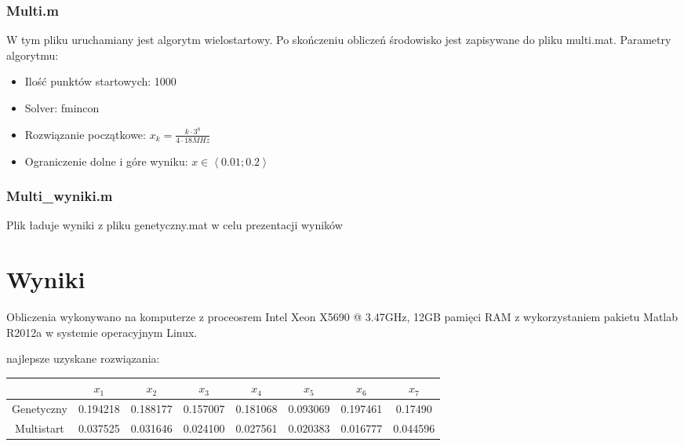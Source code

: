 \documentclass[10pt,a4paper]{article}
\begin{document}
\subsubsection{Multi.m}
W tym pliku uruchamiany jest algorytm wielostartowy.
Po skończeniu obliczeń środowisko jest zapisywane do pliku multi.mat.
Parametry algorytmu:
\begin{itemize}
\item Ilość punktów startowych: 1000
\item Solver: fmincon
\item Rozwiązanie początkowe: $x_k = \frac{k\cdot 3^8}{4 \cdot 18MHz}$
\item Ograniczenie dolne i góre wyniku: $x \in \left\langle 0.01;0.2 \right\rangle$
\end{itemize}
\subsubsection{Multi\_wyniki.m}
Plik ładuje wyniki z pliku genetyczny.mat w celu prezentacji wyników

\section{Wyniki}
Obliczenia wykonywano na komputerze z proceosrem Intel Xeon X5690 @ 3.47GHz, 12GB pamięci RAM z wykorzystaniem pakietu Matlab R2012a w systemie operacyjnym Linux.

najlepsze uzyskane rozwiązania:

\begin{tabular}{|c|c|c|c|c|c|c|c|}
\hline 
 & $x_1$ & $x_2$ & $x_3$ & $x_4$ & $x_5$ & $x_6$ & $x_7$ \\ 
\hline 
Genetyczny & 0.194218 & 0.188177 & 0.157007 & 0.181068 & 0.093069 & 0.197461 & 0.17490 \\ 
\hline 
Multistart & 0.037525 & 0.031646 & 0.024100 & 0.027561 & 0.020383 & 0.016777 & 0.044596 \\ 
\hline 
\end{tabular} 
\end{document}
